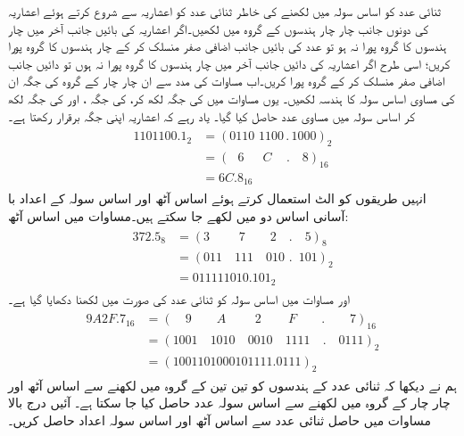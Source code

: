 	ثنائی عدد کو اساس سولہ میں لکھنے کی خاطر ثنائی عدد کو اعشاریہ سے شروع کرتے ہوئے اعشاریہ کی دونوں جانب چار چار ہندسوں کے گروہ میں لکھیں۔اگر اعشاریہ کی بائیں جانب آخر میں چار ہندسوں کا گروہ پورا نہ ہو تو عدد کی بائیں جانب اضافی صفر منسلک کر کے چار ہندسوں کا گروہ پورا کریں؛ اسی طرح اگر اعشاریہ کی دائیں جانب آخر میں چار ہندسوں کا گروہ پورا نہ ہوں تو دائیں جانب اضافی صفر منسلک کر کے گروہ پورا کریں۔اب مساوات  کی مدد سے ان چار چار کے گروہ کی جگہ ان کی مساوی اساس سولہ کا ہندسہ لکھیں۔ یوں مساوات  میں  کی جگہ  لکھ کر،  کی جگہ ، اور  کی جگہ  لکھ کر اساس سولہ میں مساوی عدد حاصل کیا گیا۔ یاد رہے کہ اعشاریہ اپنی جگہ برقرار رکھتا ہے۔
\begin{gather}
\begin{aligned}\label{مساوات_ثنائی_سولہ_تبدیل}
1101100.1_2&=(0110 \,\,1100\, . \, 1000)_2\\
&=(\phantom{0}\, 6\,\,\quad \,C\quad\, .\quad 8)_{16}\\
&=6C.8_{16}
\end{aligned}
\end{gather}
	انہیں طریقوں کو الٹ استعمال کرتے ہوئے اساس آٹھ اور اساس سولہ کے اعداد با آسانی اساس دو میں لکھے جا سکتے ہیں۔مساوات  میں اساس آٹھ:
 \begin{gather}
 \begin{aligned}\label{مساوات_ثنائی_آٹھ_تبدیل_اساس}
 372.5_8&=(3\quad\quad \,\, 7\quad\quad 2\quad . \quad 5)_8\\
 &=(011\quad 111 \quad 010\,\,. \,\,\, 101)_2\\
 &=011111010.101_2
 \end{aligned}
 \end{gather}
 اور مساوات  میں اساس سولہ کو ثنائی عدد کی صورت میں لکھنا دکھایا گیا ہے۔ 
\begin{gather}
 \begin{aligned}\label{مساوات_ثنائی_سولہ_تبدیل_اساس}
 9A2F.7_{16}&=(\quad 9 \quad \quad A\quad\quad \,\, 2\quad \quad \, F\quad \quad . \quad \quad 7)_{16}\\
 &=(1001\quad 1010\quad 0010\quad 1111\quad . \quad 0111)_2\\
 &=(1001101000101111.0111)_2
 \end{aligned}
 \end{gather}
ہم نے دیکھا کہ ثنائی عدد کے ہندسوں کو تین تین کے گروہ میں لکھنے سے اساس آٹھ اور چار چار کے گروہ میں لکھنے سے اساس سولہ عدد حاصل کیا جا سکتا ہے۔ آئیں درج بالا مساوات میں حاصل ثنائی عدد سے اساس آٹھ اور اساس سولہ اعداد حاصل کریں۔
